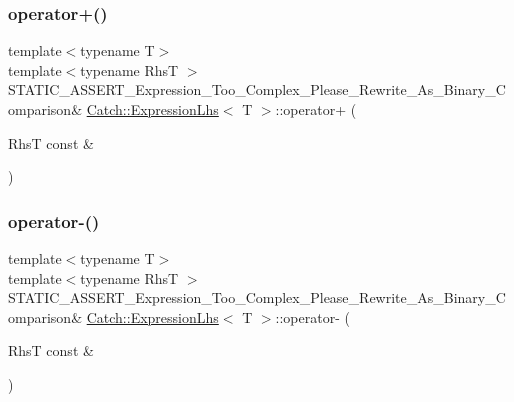 \hypertarget{class_catch_1_1_expression_lhs_a29ffb8417e977f0a98c0eb537a7ca5af}{}\label{class_catch_1_1_expression_lhs_a29ffb8417e977f0a98c0eb537a7ca5af} 
\subsubsection{\texorpdfstring{operator+()}{operator+()}}
{\footnotesize\ttfamily template$<$typename T$>$ \\
template$<$typename RhsT $>$ \\
S\+T\+A\+T\+I\+C\+\_\+\+A\+S\+S\+E\+R\+T\+\_\+\+Expression\+\_\+\+Too\+\_\+\+Complex\+\_\+\+Please\+\_\+\+Rewrite\+\_\+\+As\+\_\+\+Binary\+\_\+\+Comparison\& \hyperlink{class_catch_1_1_expression_lhs}{Catch\+::\+Expression\+Lhs}$<$ T $>$\+::operator+ (\begin{DoxyParamCaption}\item[{RhsT const \&}]{ }\end{DoxyParamCaption})}

\hypertarget{class_catch_1_1_expression_lhs_a19ef0a33442bb18efef1ec65102151d1}{}\label{class_catch_1_1_expression_lhs_a19ef0a33442bb18efef1ec65102151d1} 
\subsubsection{\texorpdfstring{operator-\/()}{operator-()}}
{\footnotesize\ttfamily template$<$typename T$>$ \\
template$<$typename RhsT $>$ \\
S\+T\+A\+T\+I\+C\+\_\+\+A\+S\+S\+E\+R\+T\+\_\+\+Expression\+\_\+\+Too\+\_\+\+Complex\+\_\+\+Please\+\_\+\+Rewrite\+\_\+\+As\+\_\+\+Binary\+\_\+\+Comparison\& \hyperlink{class_catch_1_1_expression_lhs}{Catch\+::\+Expression\+Lhs}$<$ T $>$\+::operator-\/ (\begin{DoxyParamCaption}\item[{RhsT const \&}]{ }\end{DoxyParamCaption})}

\hypertarget{class_catch_1_1_expression_lhs_a37d50565046ac9b1c9159a7c0cf88a1e}{}\label{class_catch_1_1_expression_lhs_a37d50565046ac9b1c9159a7c0cf88a1e} 
